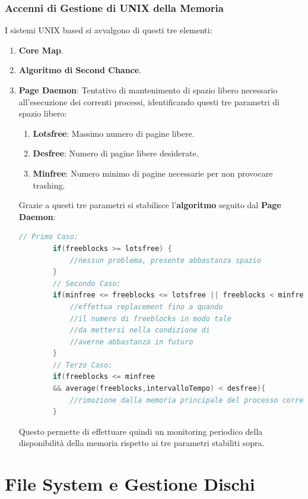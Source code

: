 \documentclass{article}
\begin{document}
\newpage

\subsubsection{Accenni di Gestione di UNIX della Memoria}

I sistemi UNIX based si avvalgono di questi tre elementi:

\begin{enumerate}
    \item \textbf{Core Map}.
    \item \textbf{Algoritmo di Second Chance}.
    \item \textbf{Page Daemon}: Tentativo di mantenimento di spazio libero necessario all'esecuzione dei correnti processi, identificando questi tre parametri di spazio libero:
    \begin{enumerate}
        \item \textbf{Lotsfree}: Massimo numero di pagine libere.
        \item \textbf{Desfree}: Numero di pagine libere desiderate.
        \item \textbf{Minfree}: Numero minimo di pagine necessarie per non provocare trashing.
    \end{enumerate}
    Grazie a questi tre parametri si stabilisce l'\textbf{algoritmo} seguito dal \textbf{Page Daemon}:
    \begin{lstlisting}[language=C]
        // Primo Caso:
        if(freeblocks >= lotsfree) {
            //nessun problema, presente abbastanza spazio
        }
        // Secondo Caso:
        if(minfree <= freeblocks <= lotsfree || freeblocks < minfree &&      average(freeblocks,intervalloTempo) > desfree){
            //effettua replacement fino a quando 
            //il numero di freeblocks in modo tale
            //da mettersi nella condizione di 
            //averne abbastanza in futuro
        }
        // Terzo Caso:
        if(freeblocks <= minfree 
        && average(freeblocks,intervalloTempo) < desfree){
            //rimozione dalla memoria principale del processo corrente
        }
    \end{lstlisting}
    \vspace*{-10px}
    Questo permette di effettuare quindi un monitoring periodico della disponibilità della memoria rispetto ai tre parametri stabiliti sopra.
\end{enumerate}

\newpage

\section{File System e Gestione Dischi}
\end{document}
